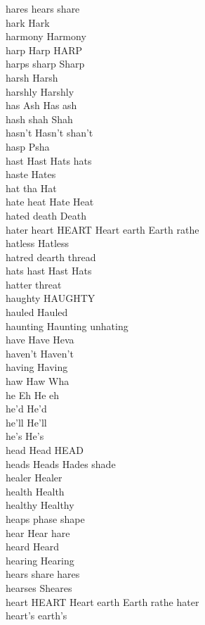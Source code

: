 hares hears share\\
hark Hark\\
harmony Harmony\\
harp Harp HARP\\
harps sharp Sharp\\
harsh Harsh\\
harshly Harshly\\
has Ash Has ash\\
hash shah Shah\\
hasn't Hasn't shan't\\
hasp Psha\\
hast Hast Hats hats\\
haste Hates\\
hat tha Hat\\
hate heat Hate Heat\\
hated death Death\\
hater heart HEART Heart earth Earth rathe\\
hatless Hatless\\
hatred dearth thread\\
hats hast Hast Hats\\
hatter threat\\
haughty HAUGHTY\\
hauled Hauled\\
haunting Haunting unhating\\
have Have Heva\\
haven't Haven't\\
having Having\\
haw Haw Wha\\
he Eh He eh\\
he'd He'd\\
he'll He'll\\
he's He's\\
head Head HEAD\\
heads Heads Hades shade\\
healer Healer\\
health Health\\
healthy Healthy\\
heaps phase shape\\
hear Hear hare\\
heard Heard\\
hearing Hearing\\
hears share hares\\
hearses Sheares\\
heart HEART Heart earth Earth rathe hater\\
heart's earth's\\
